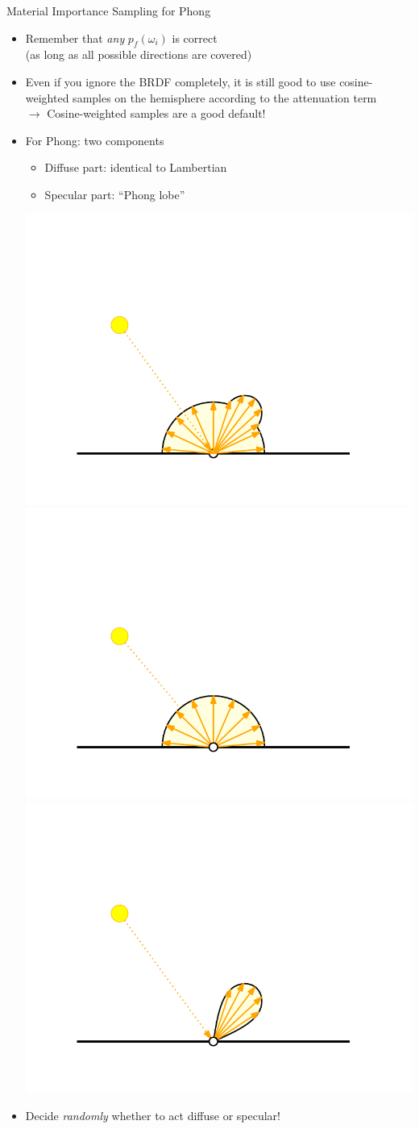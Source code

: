 \documentclass[utf8,stillsansserifmath,fleqn,t]{beamer}
\begin{document}
\begin{frame}
\frametitle{\insertsection}
Material Importance Sampling for Phong
\begin{itemize}
\item Remember that \emph{any} $p_f(\omega_i)$ is correct\\
(as long as all possible directions are covered)
\item Even if you ignore the BRDF completely, it is still good to use
cosine-weighted samples on the hemisphere according to the attenuation term\\
$\rightarrow$ Cosine-weighted samples are a good default!
\item For Phong: two components
    \begin{itemize}
    \item Diffuse part: identical to Lambertian
    \item Specular part: ``Phong lobe''
    \end{itemize}
    \includegraphics[width=.28\textwidth]{./fig/reflection-diffuse-and-glossy.pdf} \raisebox{8mm}{$=$}
    \includegraphics[width=.28\textwidth]{./fig/reflection-diffuse-and-nothing.pdf} \raisebox{8mm}{$+$}
    \includegraphics[width=.28\textwidth]{./fig/reflection-glossy-0.pdf}
\item Decide \emph{randomly} whether to act diffuse or specular!
\end{itemize}
\end{frame}
\end{document}
